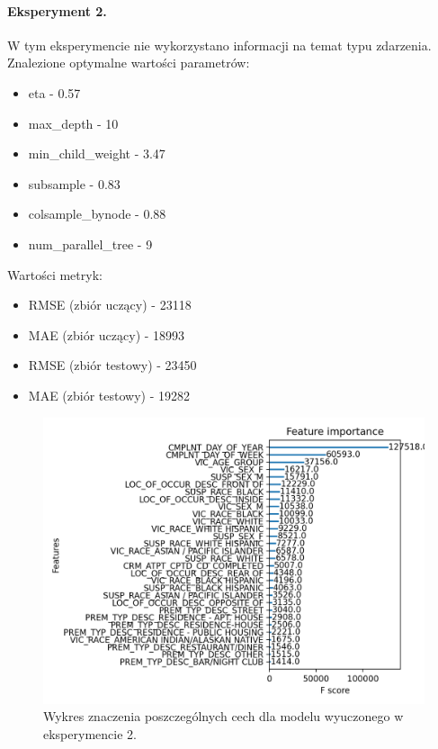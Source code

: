 \documentclass{classrep}
\begin{document}
{{{                \paragraph{Eksperyment 2.} W tym eksperymencie nie wykorzystano informacji
                na temat typu zdarzenia. Znalezione optymalne wartości parametrów:
                \begin{itemize}
                    \item eta - 0.57
                    \item max\_depth - 10
                    \item min\_child\_weight - 3.47
                    \item subsample - 0.83
                    \item colsample\_bynode - 0.88
                    \item num\_parallel\_tree - 9
                \end{itemize}
                Wartości metryk:
                \begin{itemize}
                    \item RMSE (zbiór uczący) - 23118
                    \item MAE (zbiór uczący) - 18993
                    \item RMSE (zbiór testowy) - 23450
                    \item MAE (zbiór testowy) - 19282
                \end{itemize}
                \begin{figure}[!htbp]
                    \centering
                    \includegraphics[width=\textwidth]{img/importance_2.png}
                    \caption{Wykres znaczenia poszczególnych cech dla modelu wyuczonego w eksperymencie 2.}
                    \label{importance_2}
                \end{figure}
                \FloatBarrier
            }

}}
\end{document}
